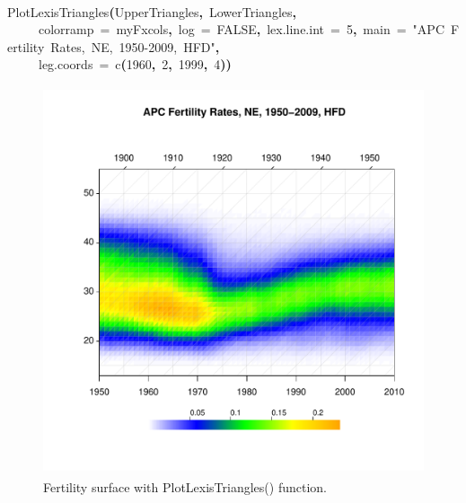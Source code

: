 \documentclass[a4paper]{article}
\newcommand{\hlnumber}[1]{\textcolor[rgb]{0.0823529411764706,0.0784313725490196,0.709803921568627}{#1}}%
\newcommand{\hlfunctioncall}[1]{\textcolor[rgb]{1,0,0}{#1}}%
\newcommand{\hlstring}[1]{\textcolor[rgb]{0.6,0.6,1}{#1}}%
\newcommand{\hlkeyword}[1]{\textcolor[rgb]{0,0,0}{\textbf{#1}}}%
\newcommand{\hlargument}[1]{\textcolor[rgb]{0.694117647058824,0.247058823529412,0.0196078431372549}{#1}}%
\newcommand{\hlsymbol}[1]{\textcolor[rgb]{0,0,0}{#1}}%
\newcommand{\hlprompt}[1]{\textcolor[rgb]{0,0,0}{#1}}%
\newcommand{\hlstd}[1]{\textcolor[rgb]{0,0,0}{#1}}%
\newenvironment{Houtput}{\raggedright}{%
%
}
\begin{document}
\begin{Houtput}
\hspace*{\fill}\\
\hlstd{}\ttfamily\noindent
\hlprompt{\usebox{\hlnormalsizeboxgreaterthan}{\ }}\hlfunctioncall{PlotLexisTriangles}\hlkeyword{(}\hlsymbol{UpperTriangles}\hlkeyword{,}{\ }\hlsymbol{LowerTriangles}\hlkeyword{,}\hspace*{\fill}\\
\hlstd{}\hlprompt{{\ }}{\ }{\ }{\ }{\ }\hlargument{colorramp}{\ }\hlargument{=}{\ }\hlsymbol{myFxcols}\hlkeyword{,}{\ }\hlargument{log}{\ }\hlargument{=}{\ }\hlnumber{FALSE}\hlkeyword{,}{\ }\hlargument{lex.line.int}{\ }\hlargument{=}{\ }\hlnumber{5}\hlkeyword{,}{\ }\hlargument{main}{\ }\hlargument{=}{\ }\hlstring{"APC{\ }Fertility{\ }Rates,{\ }NE,{\ }1950-2009,{\ }HFD"}\hlkeyword{,}\hspace*{\fill}\\
\hlstd{}\hlprompt{{\ }}{\ }{\ }{\ }{\ }\hlargument{leg.coords}{\ }\hlargument{=}{\ }\hlfunctioncall{c}\hlkeyword{(}\hlnumber{1960}\hlkeyword{,}{\ }\hlnumber{2}\hlkeyword{,}{\ }\hlnumber{1999}\hlkeyword{,}{\ }\hlnumber{4}\hlkeyword{)}\hlkeyword{)}\mbox{}
\normalfont
\hspace*{\fill}\\
\hlstd{}
\end{Houtput}



\begin{figure}[H]
\centering
\includegraphics[width=4.5in,height=4.5in]{figs/lextri.pdf}
\caption{Fertility surface with PlotLexisTriangles() function.}
\end{figure}
\end{document}
